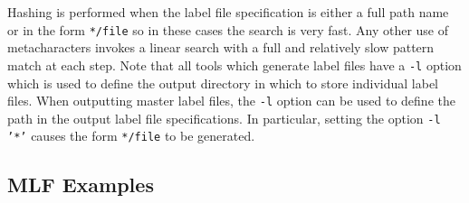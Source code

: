 Hashing is performed when the label file specification is either
a full path name or in the form \texttt{*/file} so in these cases
the search is very fast. Any other use of metacharacters invokes
a linear search with a full and relatively slow pattern match at each step.
Note that all tools which generate label files have a \texttt{-l}
option which is used to define the output directory in which to store
individual label files.  When outputting master label files,  the \texttt{-l}
option can be used to define the path in the output label file specifications.
In particular, setting the option \texttt{-l '*'} causes
the form \texttt{*/file} to be generated.

\subsection{MLF Examples}

